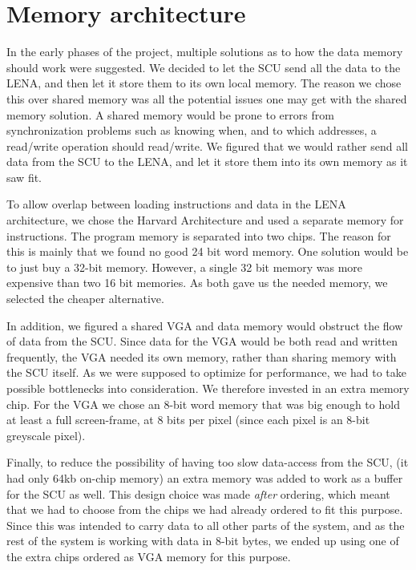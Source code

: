 \section {Memory architecture}

In the early phases of the project,
multiple solutions as to how the data memory should work were suggested. We
decided to let the \ac{SCU} send all the data to the \ac{LENA}, and then let it store
them to its own local memory. The reason we chose this over shared memory was
all the potential issues one may get with the shared memory solution. A shared memory
would be prone to errors from synchronization problems such as knowing when,
and to which addresses, a read/write operation should read/write. We figured
that we would rather send all data from the \ac{SCU} to the \ac{LENA}, and let it
store them into its own memory as it saw fit.

To allow overlap between loading instructions and data in the LENA
architecture, we chose the Harvard Architecture and used a separate memory for
instructions. The program memory is
separated into two chips. The reason for this is mainly that we found no good 24
bit word memory. One solution would be to just buy a 32-bit memory. However, a single 32
bit memory was more expensive than two 16 bit memories. As both gave us the needed memory,
we selected the cheaper alternative.

In addition, we figured a shared \ac{VGA} and data memory would obstruct the flow
of data from the \ac{SCU}. Since data for the \ac{VGA} would be both read and written
frequently, the \ac{VGA} needed its own memory, rather than sharing memory with
the SCU itself. As we were supposed to optimize for performance, we had to take
possible bottlenecks into consideration. We therefore invested in an extra
memory chip. For the VGA we chose an 8-bit word memory that was big enough to
hold at least a full screen-frame, at 8 bits per pixel (since each pixel is an 8-bit greyscale pixel).

Finally, to reduce the possibility of having too slow data-access from the SCU, (it had only 64kb on-chip memory) 
an extra memory was added to work as a buffer for the SCU as well. This design choice was made {\em after} ordering, 
which meant that we had to choose from the chips we had already ordered to fit this purpose. Since this was intended 
to carry data to all other parts of the system, and as the rest of the system is working with data in 8-bit bytes, 
we ended up using one of the extra chips ordered as \ac{VGA} memory for this purpose.

